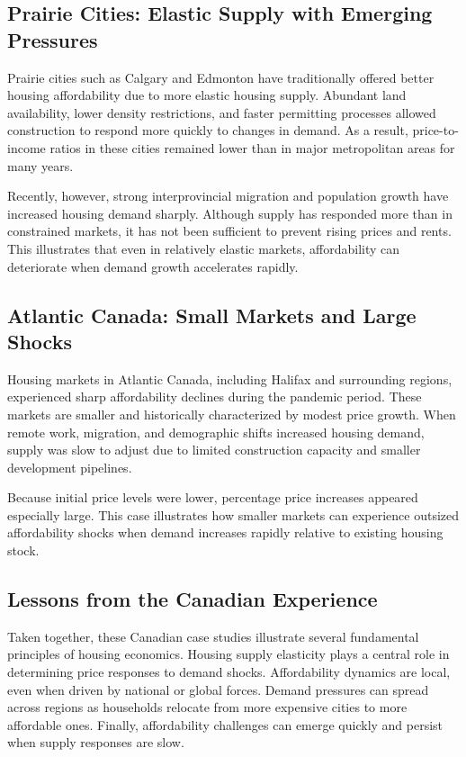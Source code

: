 \documentclass[11pt]{article}
\begin{document}
\subsection*{Prairie Cities: Elastic Supply with Emerging Pressures}

Prairie cities such as Calgary and Edmonton have traditionally offered better housing affordability due to more elastic housing supply. Abundant land availability, lower density restrictions, and faster permitting processes allowed construction to respond more quickly to changes in demand. As a result, price-to-income ratios in these cities remained lower than in major metropolitan areas for many years.

Recently, however, strong interprovincial migration and population growth have increased housing demand sharply. Although supply has responded more than in constrained markets, it has not been sufficient to prevent rising prices and rents. This illustrates that even in relatively elastic markets, affordability can deteriorate when demand growth accelerates rapidly.

\subsection*{Atlantic Canada: Small Markets and Large Shocks}

Housing markets in Atlantic Canada, including Halifax and surrounding regions, experienced sharp affordability declines during the pandemic period. These markets are smaller and historically characterized by modest price growth. When remote work, migration, and demographic shifts increased housing demand, supply was slow to adjust due to limited construction capacity and smaller development pipelines.

Because initial price levels were lower, percentage price increases appeared especially large. This case illustrates how smaller markets can experience outsized affordability shocks when demand increases rapidly relative to existing housing stock.

\subsection*{Lessons from the Canadian Experience}

Taken together, these Canadian case studies illustrate several fundamental principles of housing economics. Housing supply elasticity plays a central role in determining price responses to demand shocks. Affordability dynamics are local, even when driven by national or global forces. Demand pressures can spread across regions as households relocate from more expensive cities to more affordable ones. Finally, affordability challenges can emerge quickly and persist when supply responses are slow.
\end{document}
